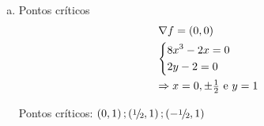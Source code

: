 \documentclass{book}
\begin{document}
\begin{enumerate}
\begin{sol}
\begin{enumerate}[(a)]
        Portanto, $g$ \'e crescente e sobrejetora.

        Ent\~ao, $\exists !z_0  \in \R$ tal que $g\left( {z_0 } \right) = 0$.

\[
\begin{gathered}
  F\left( {x_0 ,y_0 ,z_0 } \right) = 0 \hfill \\
  \frac{{\partial F}}
{{\partial z}}\left( {x_0 ,y_0 ,z_0 } \right) = \left. {3z^2  + 3} \right|_{z = z_0 }  = 3z_0^2  + 3 > 0 \hfill \\
\end{gathered}
\]

        Pelo Teorema da Fun\c{c}\~ao Impl\'icita \ref{sec17}, $\exists A \subset \R^2$ e $B \subset \R$ tal que $\left( {x_0 ,y_0 } \right) \in A$ e $z_0 \in B$ e $F\left( {x,y,z} \right) = 0,\forall \left( {x,y} \right) \in A$ e $z \in B$.

        $z=f(x,y)$ e \'e de mesma diferenciabilidade que $F$.

\[
\begin{gathered}
  f_x \left( {x,y} \right) =  - \frac{{F_x }}
{{F_z }} = \frac{{ - \left( {8x^3  - 2x} \right)}}
{{3z^2  + 3}} \hfill \\
  f_y \left( {x,y} \right) =  - \frac{{F_y }}
{{F_z }} = \frac{{ - \left( {2y - 2} \right)}}
{{3z^2  + 3}} \hfill \\
\end{gathered}
\]

        onde, $z=f(x,y)$.

    \item Pontos cr\'iticos
\[
\begin{gathered}
  \nabla f = \left( {0,0} \right) \hfill \\
  \left\{ \begin{gathered}
  8x^3  - 2x = 0 \hfill \\
  2y - 2 = 0 \hfill \\
\end{gathered}  \right. \hfill \\
   \Rightarrow x = 0, \pm \tfrac{1}
{2}{\text{ e }}y = 1 \hfill \\
\end{gathered}
\]

        Pontos cr\'iticos: $\left( {0,1} \right);\left( {{\raise0.5ex\hbox{$\scriptstyle 1$}\kern-0.1em/\kern-0.15em
\lower0.25ex\hbox{$\scriptstyle 2$}},1} \right);\left( { - {\raise0.5ex\hbox{$\scriptstyle 1$}\kern-0.1em/\kern-0.15em
\lower0.25ex\hbox{$\scriptstyle 2$}},1} \right)$


\end{enumerate}
\end{sol}
\end{enumerate}
\end{document}
